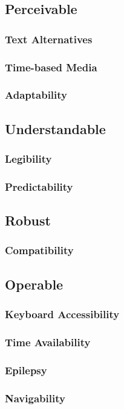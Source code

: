 \documentclass[10pt, a4paper]{article}
\begin{document}
\subsection{Perceivable}
\subsubsection{Text Alternatives}
\subsubsection{Time-based Media}
\subsubsection{Adaptability}
\subsection{Understandable}
\subsubsection{Legibility}
\subsubsection{Predictability}
\subsection{Robust}
\subsubsection{Compatibility}
\subsection{Operable}
\subsubsection{Keyboard Accessibility}
\subsubsection{Time Availability}
\subsubsection{Epilepsy}
\subsubsection{Navigability}
\end{document}
